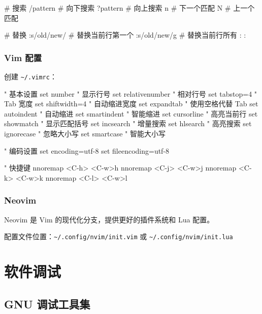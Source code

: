 \begin{lstcode}[numbers=none]
  # 搜索
  /pattern    # 向下搜索
  ?pattern    # 向上搜索
  n           # 下一个匹配
  N           # 上一个匹配

  # 替换
  :s/old/new/        # 替换当前行第一个
  :s/old/new/g       # 替换当前行所有
  :%
  :%
\end{lstcode}

\subsubsection{Vim 配置}


创建 \lstinline{~/.vimrc}：

\begin{lstcode}[numbers=none]
  " 基本设置
  set number              " 显示行号
  set relativenumber      " 相对行号
  set tabstop=4           " Tab 宽度
  set shiftwidth=4        " 自动缩进宽度
  set expandtab           " 使用空格代替 Tab
  set autoindent          " 自动缩进
  set smartindent         " 智能缩进
  set cursorline          " 高亮当前行
  set showmatch           " 显示匹配括号
  set incsearch           " 增量搜索
  set hlsearch            " 高亮搜索
  set ignorecase          " 忽略大小写
  set smartcase           " 智能大小写

  " 编码设置
  set encoding=utf-8
  set fileencoding=utf-8

  " 快捷键
  nnoremap <C-h> <C-w>h
  nnoremap <C-j> <C-w>j
  nnoremap <C-k> <C-w>k
  nnoremap <C-l> <C-w>l
\end{lstcode}

\subsubsection{Neovim}

Neovim 是 Vim 的现代化分支，提供更好的插件系统和 Lua 配置。


配置文件位置：\lstinline{~/.config/nvim/init.vim} 或 \lstinline{~/.config/nvim/init.lua}

\section{软件调试}

\subsection{GNU 调试工具集}

